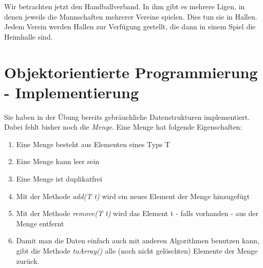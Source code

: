 \documentclass[11pt,a4paper,oneside,ngerman]{scrbook}
\begin{document}
Wir betrachten jetzt den Handballverband. In ihm gibt es mehrere Ligen, in denen jeweils die Mannschaften mehrerer Vereine spielen. Dies tun sie in Hallen. Jedem Verein werden Hallen zur Verfügung gestellt, die dann in einem Spiel die Heimhalle sind.


\newpage

\section{Objektorientierte Programmierung - Implementierung}
Sie haben in der Übung bereits gebräuchliche Datenstrukturen implementiert. Dabei fehlt bisher noch die \emph{Menge}.
Eine Menge hat folgende Eigenschaften:

\begin{enumerate}
  \item Eine Menge besteht aus Elementen eines Typs T
  \item Eine Menge kann leer sein
  \item Eine Menge ist duplikatfrei
  \item Mit der Methode \emph{add(T t)} wird ein neues Element der Menge hinzugefügt
  \item Mit der Methode \emph{remove(T t)} wird das Element t - falls vorhanden - aus der Menge entfernt
  \item Damit man die Daten einfach auch mit anderen Algorithmen benutzen kann, gibt die Methode \emph{toArray()} alle (noch nicht gelöschten) Elemente der Menge zurück.
\end{enumerate}
\end{document}
